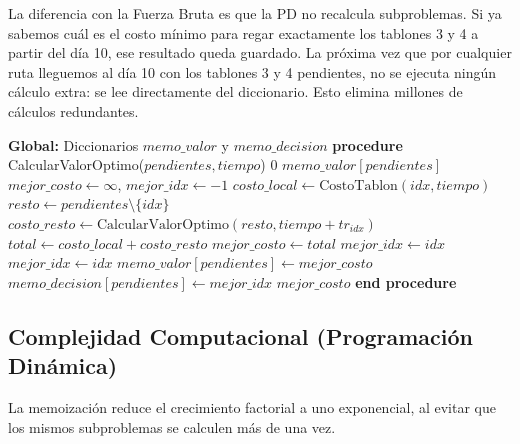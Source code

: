 \documentclass[conference, a4paper]{IEEEtran}
\begin{document}
La diferencia con la Fuerza Bruta es que la PD no recalcula subproblemas. Si ya sabemos cuál es el costo mínimo para regar exactamente los tablones 3 y 4 a partir del día 10, ese resultado queda guardado. La próxima vez que por cualquier ruta lleguemos al día 10 con los tablones 3 y 4 pendientes, no se ejecuta ningún cálculo extra: se lee directamente del diccionario. Esto elimina millones de cálculos redundantes.

\begin{algorithm}
\caption{Programación Dinámica Top-Down}
\begin{algorithmic}[1]
\STATE \textbf{Global:} Diccionarios $memo\_valor$ y $memo\_decision$
\STATE \textbf{procedure} CalcularValorOptimo($pendientes, tiempo$)
        \RETURN $0$
    \ENDIF
        \RETURN $memo\_valor[pendientes]$
    \ENDIF
    \STATE $mejor\_costo \gets \infty$, $mejor\_idx \gets -1$
        \STATE $costo\_local \gets \text{CostoTablon}(idx, tiempo)$
        \STATE $resto \gets pendientes \setminus \{idx\}$
        \STATE $costo\_resto \gets \text{CalcularValorOptimo}(resto, tiempo + tr_{idx})$
        \STATE $total \gets costo\_local + costo\_resto$
            \STATE $mejor\_costo \gets total$
            \STATE $mejor\_idx \gets idx$
            \STATE $mejor\_idx \gets idx$
        \ENDIF
    \ENDFOR
    \STATE $memo\_valor[pendientes] \gets mejor\_costo$
    \STATE $memo\_decision[pendientes] \gets mejor\_idx$
    \RETURN $mejor\_costo$
\STATE \textbf{end procedure}
\end{algorithmic}
\end{algorithm}


\subsection{Complejidad Computacional (Programación Dinámica)}
La memoización reduce el crecimiento factorial a uno exponencial, al evitar que los mismos subproblemas se calculen más de una vez.
\end{document}
